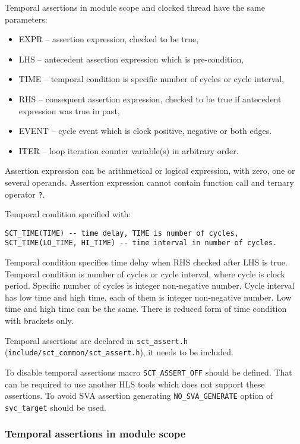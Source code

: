 Temporal assertions in module scope and clocked thread have the same parameters:
\begin{itemize}
\item EXPR -- assertion expression, checked to be true,
\item LHS -- antecedent assertion expression which is pre-condition, 
\item TIME -- temporal condition is specific number of cycles or cycle interval,
\item RHS -- consequent assertion expression, checked to be true if antecedent expression was true in past,
\item EVENT -- cycle event which is clock positive, negative or both edges.
\item ITER -- loop iteration counter variable(s) in arbitrary order.
\end{itemize}
Assertion expression can be arithmetical or logical expression, with zero, one or several operands. Assertion expression cannot contain function call and ternary operator {\tt ?}.

Temporal condition specified with:
\begin{lstlisting}[style=mycpp]
SCT_TIME(TIME) -- time delay, TIME is number of cycles,
SCT_TIME(LO_TIME, HI_TIME) -- time interval in number of cycles.
\end{lstlisting}

Temporal condition specifies time delay when RHS checked after LHS is true. Temporal condition is number of cycles or cycle interval, where cycle is clock period. Specific number of cycles is integer non-negative number. Cycle interval has low time and high time, each of them is integer non-negative number. Low time and high time can be the same. There is reduced form of time condition with brackets only.

Temporal assertions are declared in {\tt sct\_assert.h} ({\tt include/sct\_common/sct\_assert.h}), it needs to be included. 

To disable temporal assertions macro {\tt SCT\_ASSERT\_OFF} should be defined. That can be required to use another HLS tools which does not support these assertions.
To avoid SVA assertion generating {\tt NO\_SVA\_GENERATE} option of {\tt svc\_target} should be used. 

\subsubsection{Temporal assertions in module scope}

